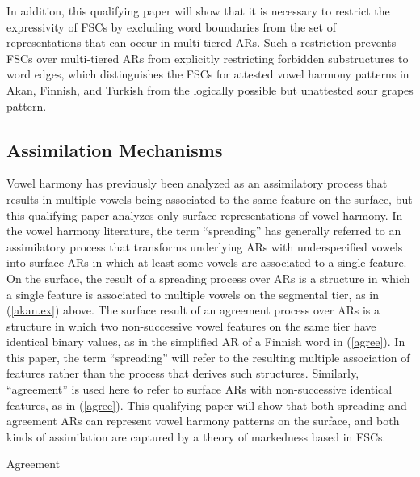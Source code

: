 \documentclass[,doc,floatsintext]{apa6}
\theoremstyle{definition}
\theoremstyle{definition}
\theoremstyle{definition}
\theoremstyle{remark}
\begin{document}
In addition, this qualifying paper will show that it is necessary to
restrict the expressivity of FSCs by excluding word boundaries from the
set of representations that can occur in multi-tiered ARs. Such a
restriction prevents FSCs over multi-tiered ARs from explicitly
restricting forbidden substructures to word edges, which distinguishes
the FSCs for attested vowel harmony patterns in Akan, Finnish, and
Turkish from the logically possible but unattested sour grapes pattern.

\subsection{Assimilation Mechanisms}\label{assimilation-mechanisms}

Vowel harmony has previously been analyzed as an assimilatory process
that results in multiple vowels being associated to the same feature on
the surface, but this qualifying paper analyzes only surface
representations of vowel harmony. In the vowel harmony literature, the
term \enquote{spreading} has generally referred to an assimilatory
process that transforms underlying ARs with underspecified vowels into
surface ARs in which at least some vowels are associated to a single
feature. On the surface, the result of a spreading process over ARs is a
structure in which a single feature is associated to multiple vowels on
the segmental tier, as in (\ref{akan.ex}) above. The surface result of
an agreement process over ARs is a structure in which two non-successive
vowel features on the same tier have identical binary values, as in the
simplified AR of a Finnish word in (\ref{agree}). In this paper, the
term \enquote{spreading} will refer to the resulting multiple
association of features rather than the process that derives such
structures. Similarly, \enquote{agreement} is used here to refer to
surface ARs with non-successive identical features, as in (\ref{agree}).
This qualifying paper will show that both spreading and agreement ARs
can represent vowel harmony patterns on the surface, and both kinds of
assimilation are captured by a theory of markedness based in FSCs.

\begin{exe}
\ex Agreement \label{agree} \\
\end{exe}
\end{document}
